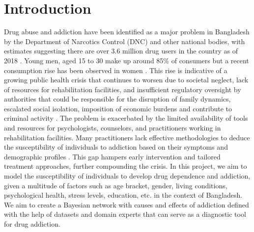 \documentclass[conference]{IEEEtran}
\begin{document}
\section{Introduction}

Drug abuse and addiction have been identified as a major problem in Bangladesh by the Department of Narcotics Control (DNC) and other national bodies, with estimates suggesting there are over 3.6 million drug users in the country as of 2018 \cite{unodc_news_2024}. Young men, aged 15 to 30 make up around 85\% of consumers but a recent consumption rise has been observed in women \cite{pmc8554893}. This rise is indicative of a growing public health crisis that continues to worsen due to societal neglect, lack of resources for rehabilitation facilities, and insufficient regulatory oversight by authorities that could be responsible for the disruption of family dynamics, escalated social isolation, imposition of economic burdens and contribute to criminal activity \cite{emerald_drug_crisis_2024}.
The problem is exacerbated by the limited availability of tools and resources for psychologists, counselors, and practitioners working in rehabilitation facilities. Many practitioners lack effective methodologies to deduce the susceptibility of individuals to addiction based on their symptoms and demographic profiles \cite{PMC8294555}. This gap hampers early intervention and tailored treatment approaches, further compounding the crisis. In this project, we aim to model the susceptibility of individuals to develop drug dependence and addiction, given a multitude of factors such as age bracket, gender, living conditions, psychological health, stress levels, education, etc. in the context of Bangladesh. We aim to create a Bayesian network with causes and effects of addiction defined with the help of datasets and domain experts that can serve as a diagnostic tool for drug addiction. 
\end{document}
